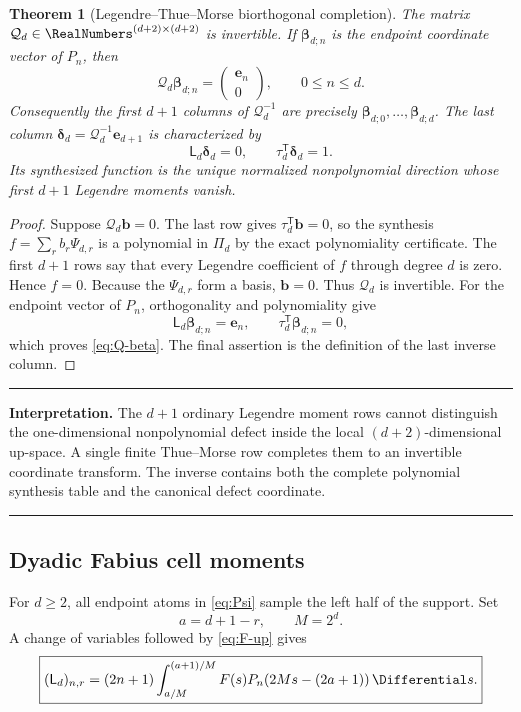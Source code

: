 \documentclass[11pt,oneside]{article}
\newtheorem{theorem}{Theorem}[section]
\theoremstyle{definition}
\theoremstyle{remark}
\newcommand{\cQ}{\mathcal Q}
\newenvironment{resultbox}{%
  \par\smallskip\noindent\begin{center}\begin{minipage}{0.94\textwidth}%
  \hrule\vspace{0.55em}\small
}{%
  \vspace{0.55em}\hrule\end{minipage}\end{center}\smallskip
}
\begin{document}
\begin{theorem}[Legendre--Thue--Morse biorthogonal completion]
\label{thm:augmented-invertible}
The matrix $\cQ_d\in\RealNumbers^{(d+2)\times(d+2)}$ is invertible.  If
$\bm\beta_{d;n}$ is the endpoint coordinate vector of $P_n$, then
\begin{equation}
 \cQ_d\bm\beta_{d;n}=
 \begin{pmatrix}\bm e_n\\0\end{pmatrix},
 \qquad0\le n\le d.
 \label{eq:Q-beta}
\end{equation}
Consequently the first $d+1$ columns of $\cQ_d^{-1}$ are precisely
$\bm\beta_{d;0},\ldots,\bm\beta_{d;d}$.  The last column
$\bm\delta_d=\cQ_d^{-1}\bm e_{d+1}$ is characterized by
\begin{equation}
 \mathsf L_d\bm\delta_d=0,
 \qquad
 \tau_d^{\mathsf T}\bm\delta_d=1.
 \label{eq:defect-column}
\end{equation}
Its synthesized function is the unique normalized nonpolynomial direction
whose first $d+1$ Legendre moments vanish.
\end{theorem}

\begin{proof}
Suppose $\cQ_d\bm b=0$.  The last row gives
$\tau_d^{\mathsf T}\bm b=0$, so the synthesis
$f=\sum_rb_r\Psi_{d,r}$ is a polynomial in $\Pi_d$ by the exact
polynomiality certificate.  The first $d+1$ rows say that every Legendre
coefficient of $f$ through degree $d$ is zero.  Hence $f=0$.  Because the
$\Psi_{d,r}$ form a basis, $\bm b=0$.  Thus $\cQ_d$ is invertible.
For the endpoint vector of $P_n$, orthogonality and polynomiality give
\[
 \mathsf L_d\bm\beta_{d;n}=\bm e_n,
 \qquad \tau_d^{\mathsf T}\bm\beta_{d;n}=0,
\]
which proves \eqref{eq:Q-beta}.  The final assertion is the definition of the
last inverse column.
\end{proof}

\begin{resultbox}
\textbf{Interpretation.}
The $d+1$ ordinary Legendre moment rows cannot distinguish the one-dimensional
nonpolynomial defect inside the local $(d+2)$-dimensional up-space.  A single
finite Thue--Morse row completes them to an invertible coordinate transform.
The inverse contains both the complete polynomial synthesis table and the
canonical defect coordinate.
\end{resultbox}

\subsection{Dyadic Fabius cell moments}
For $d\ge2$, all endpoint atoms in \eqref{eq:Psi} sample the left half of the
support.  Set
\begin{equation}
 a=d+1-r,
 \qquad M=2^d.
 \label{eq:a-cell}
\end{equation}
A change of variables followed by \eqref{eq:F-up} gives
\begin{equation}
 \boxed{
 (\mathsf L_d)_{n,r}
 =(2n+1)\int_{a/M}^{(a+1)/M}
 F(s)P_n\!\left(2Ms-(2a+1)\right)\Differential s.}
 \label{eq:F-cell-matrix}
\end{equation}
\end{document}
